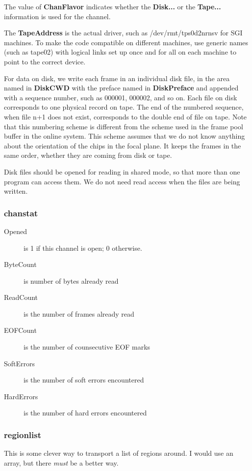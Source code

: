 The value of {\bf ChanFlavor} indicates whether the {\bf Disk...} or the
{\bf Tape...} information is used for the channel.

The {\bf TapeAddress} is the actual driver, such as /dev/rmt/tps0d2nrnsv
for SGI machines.  To make the code compatible on different machines,
use  generic names (such as tape02) with logical
links set up once and for all on each machine to point to the correct device.

For data on disk, we write each frame in an individual disk file, in the
area named in {\bf DiskCWD} with the preface named in {\bf DiskPreface}
and appended with a sequence number, such as 000001, 000002, and so on.
Each file on disk corresponds to one physical record on tape.  The end
of the numbered sequence, when file n+1 does not exist, corresponds to 
the double end of file on tape.  Note that this numbering scheme is
different from the scheme used in the frame pool buffer in the online
system.  This scheme assumes that we do not know anything about the
orientation of the chips in the focal plane.  It keeps the frames in
the same order, whether they are coming from disk or tape.

Disk files should be opened for reading in shared mode, so that more than
one program can access them.  
We do not need read access when the files are being written.

\subsubsection{chanstat}
\begin{description}
	\item[Opened] is 1 if this channel is open; 0 otherwise.
	\item[ByteCount] is number of bytes already read
	\item[ReadCount] is the number of frames already read
	\item[EOFCount] is the number of counsecutive EOF marks 
	\item[SoftErrors] is the number of soft errors encountered
	\item[HardErrors] is the number of hard errors encountered
\end{description}

\subsubsection{regionlist}
This is some clever way to transport a list of regions around.  
I would use an array, but there {\em must} be a better way.


